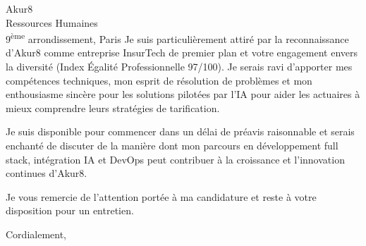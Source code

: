\documentclass[11pt,a4paper]{letter}
\begin{document}
\begin{letter}{
    Akur8 \\
    Ressources Humaines \\
    9\textsuperscript{ème} arrondissement, Paris
}
Je suis particulièrement attiré par la reconnaissance d'Akur8 comme entreprise InsurTech de premier plan et votre engagement envers la diversité (Index Égalité Professionnelle 97/100). Je serais ravi d'apporter mes compétences techniques, mon esprit de résolution de problèmes et mon enthousiasme sincère pour les solutions pilotées par l'IA pour aider les actuaires à mieux comprendre leurs stratégies de tarification.

Je suis disponible pour commencer dans un délai de préavis raisonnable et serais enchanté de discuter de la manière dont mon parcours en développement full stack, intégration IA et DevOps peut contribuer à la croissance et l'innovation continues d'Akur8.

Je vous remercie de l'attention portée à ma candidature et reste à votre disposition pour un entretien.

\closing{Cordialement,}

\end{letter}
\end{document}
